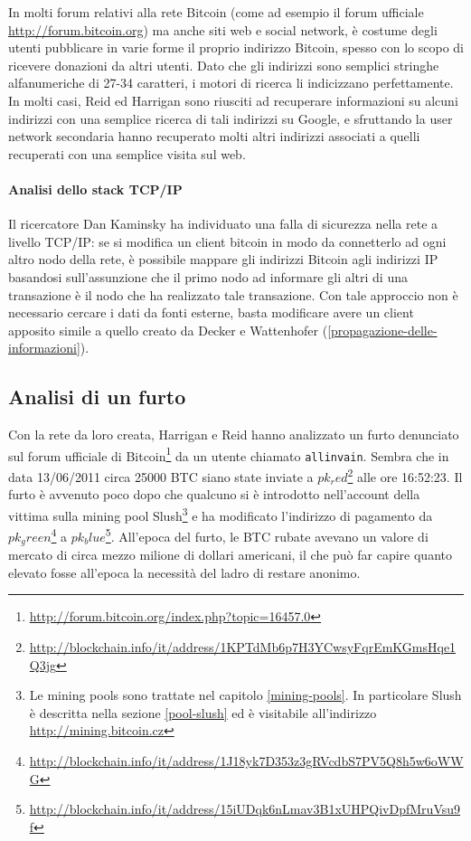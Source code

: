 In molti forum relativi alla rete Bitcoin (come ad esempio il forum ufficiale \url{http://forum.bitcoin.org}) ma anche siti web e social network, è costume degli utenti pubblicare in varie forme il proprio indirizzo Bitcoin, spesso con lo scopo di ricevere donazioni da altri utenti. Dato che gli indirizzi sono semplici stringhe alfanumeriche di 27-34 caratteri, i motori di ricerca li indicizzano perfettamente.
In molti casi, Reid ed Harrigan sono riusciti ad recuperare informazioni su alcuni indirizzi con una semplice ricerca di tali indirizzi su Google, e sfruttando la user network secondaria hanno recuperato molti altri indirizzi associati a quelli recuperati con una semplice visita sul web.

\paragraph{Analisi dello stack TCP/IP}

Il ricercatore Dan Kaminsky ha individuato una falla di sicurezza nella rete a livello TCP/IP: se si modifica un client bitcoin in modo da connetterlo ad ogni altro nodo della rete, è possibile mappare gli indirizzi Bitcoin agli indirizzi IP basandosi sull'assunzione che il primo nodo ad informare gli altri di una transazione è il nodo che ha realizzato tale transazione. Con tale approccio non è necessario cercare i dati da fonti esterne, basta modificare avere un client apposito simile a quello creato da Decker e Wattenhofer (\ref{propagazione-delle-informazioni}).

\subsection{Analisi di un furto}


Con la rete da loro creata, Harrigan e Reid hanno analizzato un furto denunciato sul forum ufficiale di Bitcoin\footnote{\url{http://forum.bitcoin.org/index.php?topic=16457.0}} da un utente chiamato \verb|allinvain|. Sembra che in data 13/06/2011 circa 25000 BTC siano state inviate a $pk_red$\footnote{\url{http://blockchain.info/it/address/1KPTdMb6p7H3YCwsyFqrEmKGmsHqe1Q3jg}} alle ore 16:52:23. Il furto è avvenuto poco dopo che qualcuno si è introdotto nell'account della vittima sulla mining pool Slush\footnote{Le mining pools sono trattate nel capitolo \ref{mining-pools}. In particolare Slush è descritta nella sezione \ref{pool-slush} ed è visitabile all'indirizzo \url{http://mining.bitcoin.cz}} e ha modificato l'indirizzo di pagamento da $pk_green$\footnote{\url{http://blockchain.info/it/address/1J18yk7D353z3gRVcdbS7PV5Q8h5w6oWWG}} a $pk_blue$\footnote{\url{http://blockchain.info/it/address/15iUDqk6nLmav3B1xUHPQivDpfMruVsu9f}}. All'epoca del furto, le BTC rubate avevano un valore di mercato di circa mezzo milione di dollari americani, il che può far capire quanto elevato fosse all'epoca la necessità del ladro di restare anonimo.

